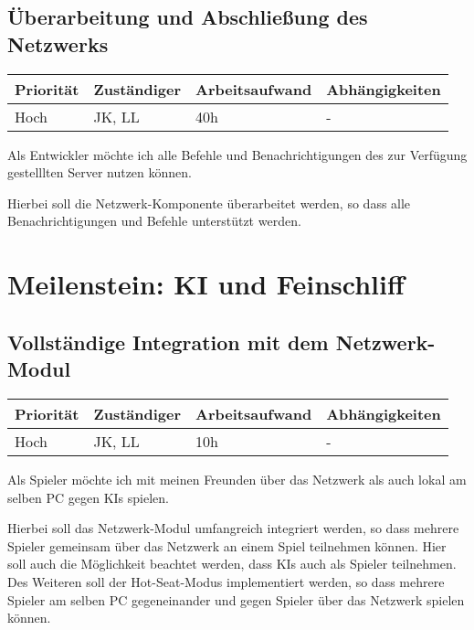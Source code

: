 \documentclass[a4paper]{scrreprt}
\newenvironment{requirement}[5] {
	\subsection{#1}
	\begin{tabularx}{\textwidth}{|X|l|X|X|}
		\hline
		Priorität & Zuständiger & Arbeitsaufwand & Abhängigkeiten \\
		\hline
		#2 & #3 & #4 & #5 \\
		\hline
	\end{tabularx}
	}{
	\newpage
	}
\begin{document}
\begin{requirement}{Überarbeitung und Abschließung des Netzwerks}{Hoch}{JK, LL}{40h}{-}

\begin{center}
	Als Entwickler möchte ich alle Befehle und Benachrichtigungen des zur Verfügung gestelllten Server nutzen können.
\end{center}

Hierbei soll die Netzwerk-Komponente überarbeitet werden, so dass alle Benachrichtigungen und Befehle unterstützt werden. 

\end{requirement}


\section{Meilenstein: KI und Feinschliff}


\begin{requirement}{Vollständige Integration mit dem Netzwerk-Modul}{Hoch}{JK, LL}{10h}{-}

\begin{center}
	Als Spieler möchte ich mit meinen Freunden über das Netzwerk als auch lokal am selben PC gegen KIs spielen.
\end{center}

Hierbei soll das Netzwerk-Modul umfangreich integriert werden, so dass mehrere Spieler gemeinsam über das Netzwerk an einem Spiel teilnehmen können. Hier soll auch die Möglichkeit beachtet werden, dass KIs auch als Spieler teilnehmen. Des Weiteren soll der Hot-Seat-Modus implementiert werden, so dass mehrere Spieler am selben PC gegeneinander und gegen Spieler über das Netzwerk spielen können.

\end{requirement}
\end{document}
